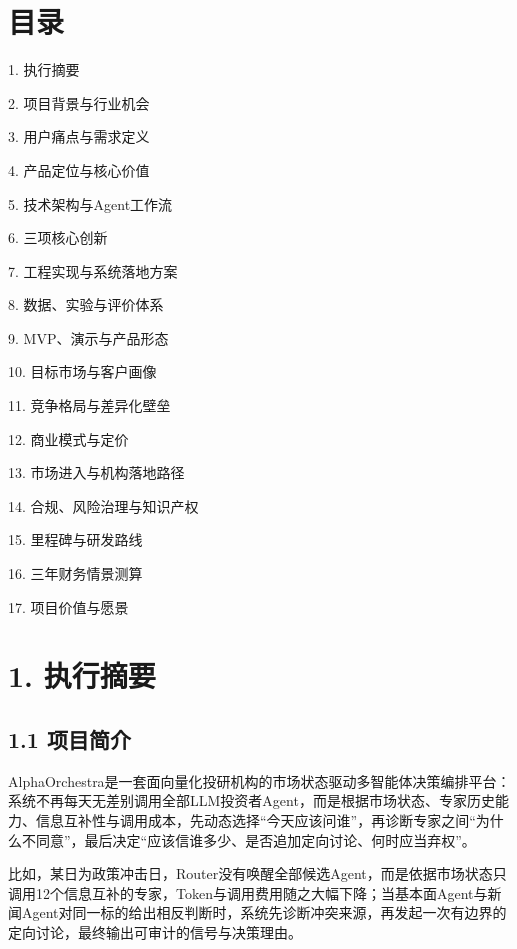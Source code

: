 \documentclass[12pt,a4paper]{ctexart}
\begin{document}
\clearpage

\section{\texorpdfstring{\textbf{目录}}{目录}}\label{ux76eeux5f55}

1. 执行摘要

2. 项目背景与行业机会

3. 用户痛点与需求定义

4. 产品定位与核心价值

5. 技术架构与Agent工作流

6. 三项核心创新

7. 工程实现与系统落地方案

8. 数据、实验与评价体系

9. MVP、演示与产品形态

10. 目标市场与客户画像

11. 竞争格局与差异化壁垒

12. 商业模式与定价

13. 市场进入与机构落地路径

14. 合规、风险治理与知识产权

15. 里程碑与研发路线

16. 三年财务情景测算

17. 项目价值与愿景

\clearpage

\section{\texorpdfstring{\textbf{1.
执行摘要}}{1. 执行摘要}}\label{ux6267ux884cux6458ux8981}

\subsection{\texorpdfstring{\textbf{1.1
项目简介}}{1.1 项目简介}}\label{ux9879ux76eeux7b80ux4ecb}

AlphaOrchestra是一套面向量化投研机构的市场状态驱动多智能体决策编排平台：系统不再每天无差别调用全部LLM投资者Agent，而是根据市场状态、专家历史能力、信息互补性与调用成本，先动态选择``今天应该问谁''，再诊断专家之间``为什么不同意''，最后决定``应该信谁多少、是否追加定向讨论、何时应当弃权''。

比如，某日为政策冲击日，Router没有唤醒全部候选Agent，而是依据市场状态只调用12个信息互补的专家，Token与调用费用随之大幅下降；当基本面Agent与新闻Agent对同一标的给出相反判断时，系统先诊断冲突来源，再发起一次有边界的定向讨论，最终输出可审计的信号与决策理由。
\end{document}
